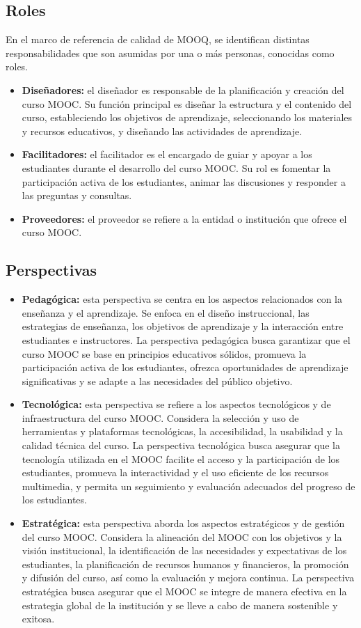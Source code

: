 \subsection{Roles}
En el marco de referencia de calidad de MOOQ, se identifican distintas responsabilidades que son asumidas por una o más personas, conocidas como roles. 
\begin{itemize}
	\item \textbf{Diseñadores:}
	el diseñador es responsable de la planificación y creación del curso MOOC. Su función principal es diseñar la estructura y el contenido del curso, estableciendo los objetivos de aprendizaje, seleccionando los materiales y recursos educativos, y diseñando las actividades de aprendizaje. 
	\item \textbf{Facilitadores:}
	el facilitador es el encargado de guiar y apoyar a los estudiantes durante el desarrollo del curso MOOC. Su rol es fomentar la participación activa de los estudiantes, animar las discusiones y responder a las preguntas y consultas.
	\item \textbf{Proveedores:}
	el proveedor se refiere a la entidad o institución que ofrece el curso MOOC. 
\end{itemize}


\subsection{Perspectivas}
\begin{itemize}
	\item \textbf{Pedagógica:}
	esta perspectiva se centra en los aspectos relacionados con la enseñanza y el aprendizaje. Se enfoca en el diseño instruccional, las estrategias de enseñanza, los objetivos de aprendizaje y la interacción entre estudiantes e instructores. La perspectiva pedagógica busca garantizar que el curso MOOC se base en principios educativos sólidos, promueva la participación activa de los estudiantes, ofrezca oportunidades de aprendizaje significativas y se adapte a las necesidades del público objetivo.
	\item \textbf{Tecnológica:}
	esta perspectiva se refiere a los aspectos tecnológicos y de infraestructura del curso MOOC. Considera la selección y uso de herramientas y plataformas tecnológicas, la accesibilidad, la usabilidad y la calidad técnica del curso. La perspectiva tecnológica busca asegurar que la tecnología utilizada en el MOOC facilite el acceso y la participación de los estudiantes, promueva la interactividad y el uso eficiente de los recursos multimedia, y permita un seguimiento y evaluación adecuados del progreso de los estudiantes.
	\item \textbf{Estratégica:}
	esta perspectiva aborda los aspectos estratégicos y de gestión del curso MOOC. Considera la alineación del MOOC con los objetivos y la visión institucional, la identificación de las necesidades y expectativas de los estudiantes, la planificación de recursos humanos y financieros, la promoción y difusión del curso, así como la evaluación y mejora continua. La perspectiva estratégica busca asegurar que el MOOC se integre de manera efectiva en la estrategia global de la institución y se lleve a cabo de manera sostenible y exitosa.
\end{itemize}

